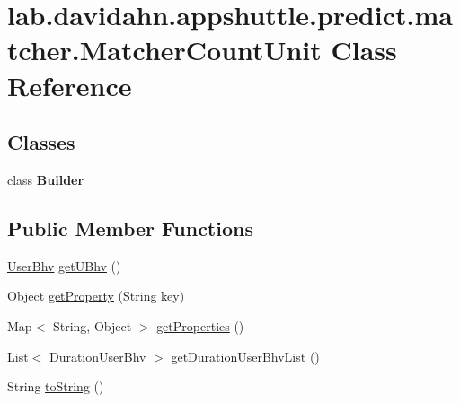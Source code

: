 \hypertarget{classlab_1_1davidahn_1_1appshuttle_1_1predict_1_1matcher_1_1_matcher_count_unit}{\section{lab.\-davidahn.\-appshuttle.\-predict.\-matcher.\-Matcher\-Count\-Unit \-Class \-Reference}
\label{classlab_1_1davidahn_1_1appshuttle_1_1predict_1_1matcher_1_1_matcher_count_unit}
}
\subsection*{\-Classes}
\begin{DoxyCompactItemize}
\item 
class {\bfseries \-Builder}
\end{DoxyCompactItemize}
\subsection*{\-Public \-Member \-Functions}
\begin{DoxyCompactItemize}
\item 
\hyperlink{interfacelab_1_1davidahn_1_1appshuttle_1_1collect_1_1bhv_1_1_user_bhv}{\-User\-Bhv} \hyperlink{classlab_1_1davidahn_1_1appshuttle_1_1predict_1_1matcher_1_1_matcher_count_unit_a7eed620c08765aeef742400e5f45cdd8}{get\-U\-Bhv} ()
\item 
\-Object \hyperlink{classlab_1_1davidahn_1_1appshuttle_1_1predict_1_1matcher_1_1_matcher_count_unit_ab902feccf554924b14f25088a4d8d0fe}{get\-Property} (\-String key)
\item 
\-Map$<$ \-String, \-Object $>$ \hyperlink{classlab_1_1davidahn_1_1appshuttle_1_1predict_1_1matcher_1_1_matcher_count_unit_a01a692188365affd0d68bcdfd3f4c929}{get\-Properties} ()
\item 
\-List$<$ \hyperlink{classlab_1_1davidahn_1_1appshuttle_1_1collect_1_1bhv_1_1_duration_user_bhv}{\-Duration\-User\-Bhv} $>$ \hyperlink{classlab_1_1davidahn_1_1appshuttle_1_1predict_1_1matcher_1_1_matcher_count_unit_acb9c48dd7e14b1bed4ed50ec4bb346c0}{get\-Duration\-User\-Bhv\-List} ()
\item 
\-String \hyperlink{classlab_1_1davidahn_1_1appshuttle_1_1predict_1_1matcher_1_1_matcher_count_unit_aa700c8f71ad0a34b4f2190553c57d2ce}{to\-String} ()
\end{DoxyCompactItemize}


